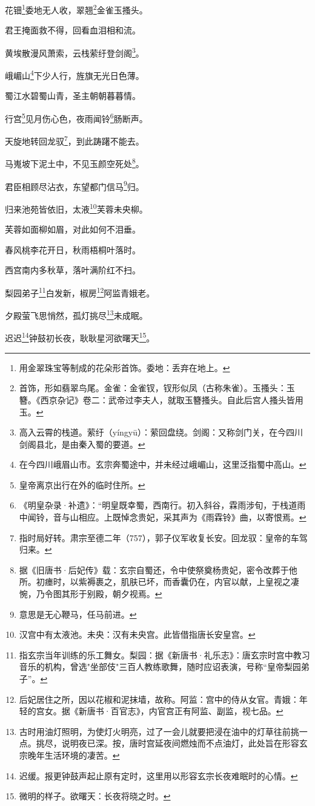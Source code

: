 \documentclass{article}
\begin{document}
花钿\footnote{用金翠珠宝等制成的花朵形首饰。委地：丢弃在地上。}委地无人收，翠翘\footnote{首饰，形如翡翠鸟尾。金雀：金雀钗，钗形似凤（古称朱雀）。玉搔头：玉簪。《西京杂记》卷二：武帝过李夫人，就取玉簪搔头。自此后宫人搔头皆用玉。}金雀玉搔头。

君王掩面救不得，回看血泪相和流。

黄埃散漫风萧索，云栈萦纡登剑阁\footnote{高入云霄的栈道。萦纡（yíngyū）：萦回盘绕。剑阁：又称剑门关，在今四川剑阁县北，是由秦入蜀的要道。}。

峨嵋山\footnote{在今四川峨眉山市。玄宗奔蜀途中，并未经过峨嵋山，这里泛指蜀中高山。}下少人行，旌旗无光日色薄。

蜀江水碧蜀山青，圣主朝朝暮暮情。

行宫\footnote{皇帝离京出行在外的临时住所。}见月伤心色，夜雨闻铃\footnote{《明皇杂录·补遗》：“明皇既幸蜀，西南行。初入斜谷，霖雨涉旬，于栈道雨中闻铃，音与山相应。上既悼念贵妃，采其声为《雨霖铃》曲，以寄恨焉。}肠断声。

天旋地转回龙驭\footnote{指时局好转。肃宗至德二年（757），郭子仪军收复长安。回龙驭：皇帝的车驾归来。}，到此踌躇不能去。

马嵬坡下泥土中，不见玉颜空死处\footnote{据《旧唐书·后妃传》载：玄宗自蜀还，令中使祭奠杨贵妃，密令改葬于他所。初瘗时，以紫褥裹之，肌肤已坏，而香囊仍在，内官以献，上皇视之凄惋，乃令图其形于别殿，朝夕视焉。}。

君臣相顾尽沾衣，东望都门信马\footnote{意思是无心鞭马，任马前进。}归。

归来池苑皆依旧，太液\footnote{汉宫中有太液池。未央：汉有未央宫。此皆借指唐长安皇宫。}芙蓉未央柳。

芙蓉如面柳如眉，对此如何不泪垂。

春风桃李花开日，秋雨梧桐叶落时。

西宫南内多秋草，落叶满阶红不扫。

梨园弟子\footnote{指玄宗当年训练的乐工舞女。梨园：据《新唐书·礼乐志》：唐玄宗时宫中教习音乐的机构，曾选"坐部伎"三百人教练歌舞，随时应诏表演，号称“皇帝梨园弟子”。}白发新，椒房\footnote{后妃居住之所，因以花椒和泥抹墙，故称。阿监：宫中的侍从女官。青娥：年轻的宫女。据《新唐书·百官志》，内官宫正有阿监、副监，视七品。}阿监青娥老。

夕殿萤飞思悄然，孤灯挑尽\footnote{古时用油灯照明，为使灯火明亮，过了一会儿就要把浸在油中的灯草往前挑一点。挑尽，说明夜已深。按，唐时宫延夜间燃烛而不点油灯，此处旨在形容玄宗晚年生活环境的凄苦。}未成眠。

迟迟\footnote{迟缓。报更钟鼓声起止原有定时，这里用以形容玄宗长夜难眠时的心情。}钟鼓初长夜，耿耿星河欲曙天\footnote{微明的样子。欲曙天：长夜将晓之时。}。
\end{document}
